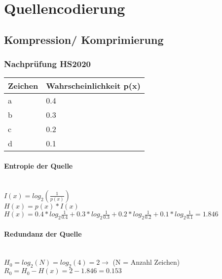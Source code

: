 

\section{Quellencodierung}

\subsection{Kompression/ Komprimierung}

\subsubsection{Nachprüfung HS2020}
\begin{center}
    \centering
    \begin{tabular}{l | l}
        \bfseries{Zeichen} & \bfseries{Wahrscheinlichkeit p(x)}\\ \hline
        a & 0.4\\ 
        b & 0.3\\
        c & 0.2\\
        d & 0.1\\
    \end{tabular}
\end{center}

\paragraph{Entropie der Quelle}\mbox{}\\
$I(x) = log_{2}(\frac{1}{p(x)})$\\
$H(x) = p(x)*I(x)$\\
$H(x) = 0.4*log_2\frac{1}{0.4}+0.3*log_2\frac{1}{0.3}+0.2*log_2\frac{1}{0.2}+0.1*log_2\frac{1}{0.1}=1.846$

\paragraph{Redundanz der Quelle}\mbox{}\\
$H_0 = log_2(N) = log_2(4) = 2 \rightarrow$ (N = Anzahl Zeichen)\\
$R_0 = H_0 - H(x) = 2-1.846=0.153$

